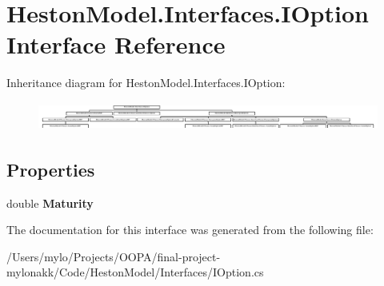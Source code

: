 \hypertarget{interface_heston_model_1_1_interfaces_1_1_i_option}{}\section{Heston\+Model.\+Interfaces.\+I\+Option Interface Reference}
\label{interface_heston_model_1_1_interfaces_1_1_i_option}
Inheritance diagram for Heston\+Model.\+Interfaces.\+I\+Option\+:\begin{figure}[H]
\begin{center}
\leavevmode
\includegraphics[height=0.952381cm]{interface_heston_model_1_1_interfaces_1_1_i_option}
\end{center}
\end{figure}
\subsection*{Properties}
\begin{DoxyCompactItemize}
\item 
\mbox{\label{interface_heston_model_1_1_interfaces_1_1_i_option_ab0b6919f9fa6449d4b888304fe66ba87}} 
double {\bfseries Maturity}
\end{DoxyCompactItemize}


The documentation for this interface was generated from the following file\+:\begin{DoxyCompactItemize}
\item 
/\+Users/mylo/\+Projects/\+O\+O\+P\+A/final-\/project-\/mylonakk/\+Code/\+Heston\+Model/\+Interfaces/I\+Option.\+cs\end{DoxyCompactItemize}
